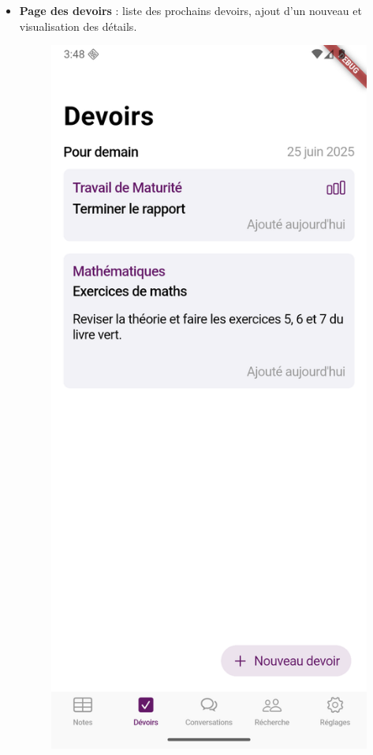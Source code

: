 \documentclass[12pt]{report}
\begin{document}
\begin{itemize}
	\item \textbf{Page des devoirs} : liste des prochains devoirs, ajout d’un nouveau et visualisation des détails.
	
	\begin{figure}[H]
		\centering
		\begin{minipage}[t]{0.32\textwidth}
			\centering
			\includegraphics[width=\textwidth]{img/homework.png}

\end{minipage}
\end{figure}
\end{itemize}
\end{document}
